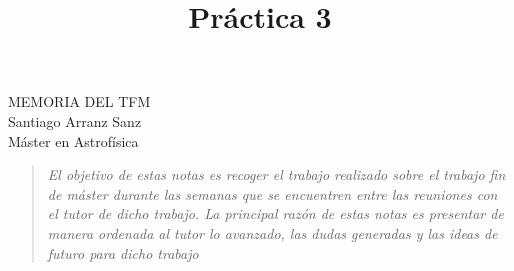 \documentclass{article}
\title{Pr\'actica 3}
\begin{document}
\vspace*{2 cm}
\begin{center}
{\LARGE MEMORIA DEL TFM}\\[0.5cm]
{\large Santiago Arranz Sanz}\\[0.2cm]
{\large Máster en Astrofísica}\\[0.2cm]


\vspace*{0.1cm}
\end{center}


\hrulefill
\begin{quote}
\textit{El objetivo de estas notas es recoger el trabajo realizado sobre el trabajo fin de máster durante las semanas que se encuentren entre las reuniones con el tutor de dicho trabajo. La principal razón de estas notas es presentar de manera ordenada al tutor lo avanzado, las dudas generadas y las ideas de futuro para dicho trabajo}
\end{quote}
\hrulefill





 
 
\end{document}
